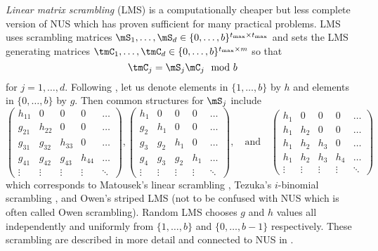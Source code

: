 \documentclass[acmsmall]{acmart}
\begin{document}
\emph{Linear matrix scrambling} (LMS) is a computationally cheaper but less complete version of NUS which has proven sufficient for many practical problems. LMS uses scrambling matrices $\mS_1,\dots,\mS_d \in \{0,\dots,b\}^{t_\mathrm{max} \times t_\mathrm{max}}$ and sets the LMS generating matrices $\tmC_1,\dots,\tmC_d \in \{0,\dots,b\}^{t_\mathrm{max} \times m}$ so that 
$$\tmC_j = \mS_j \mC_j \mod b$$
for $j=1,\dots,d$. Following \citep{owen.variance_alternative_scrambles_digital_net}, let us denote elements in $\{1,\dots,b\}$ by $h$ and elements in $\{0,\dots,b\}$  by $g$. Then common structures for $\mS_j$ include 
$$\begin{pmatrix} h_{11} & 0 & 0 & 0 & \dots \\ g_{21} & h_{22} & 0 & 0 & \dots \\ g_{31} & g_{32} & h_{33} & 0 & \dots \\ g_{41} & g_{42} & g_{43} & h_{44} & \dots \\ \vdots & \vdots & \vdots & \vdots & \ddots \end{pmatrix}, \begin{pmatrix} h_1 & 0 & 0 & 0 & \dots \\ g_2 & h_1 & 0 & 0 & \dots \\ g_3 & g_2 & h_1 & 0 & \dots \\ g_4 & g_3 & g_2 & h_1 & \dots \\ \vdots & \vdots & \vdots & \vdots & \ddots \end{pmatrix}, \quad\text{and}\quad \begin{pmatrix} h_1 & 0 & 0 & 0 & \dots \\ h_1 & h_2 & 0 & 0 & \dots \\ h_1 & h_2 & h_3 & 0 & \dots \\ h_1 & h_2 & h_3 & h_4 & \dots \\ \vdots & \vdots & \vdots & \vdots & \ddots \end{pmatrix}$$
which corresponds to Matousek’s linear scrambling \citep{MATOUSEK1998527}, Tezuka's $i$-binomial scrambling \citep{tezuka2002randomization}, and Owen's striped LMS \citep{owen.variance_alternative_scrambles_digital_net} (not to be confused with NUS which is often called Owen scrambling). Random LMS chooses $g$ and $h$ values all independently and uniformly from $\{1,\dots,b\}$ and $\{0,\dots,b-1\}$ respectively. These scrambling are described in more detail and connected to NUS in \citep{owen.variance_alternative_scrambles_digital_net}.
\end{document}
